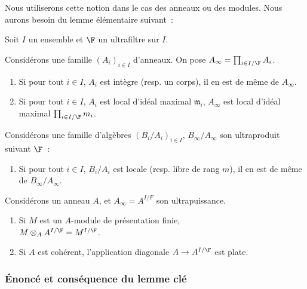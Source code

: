 \documentclass[10pt]{../fichiers-configuration-latex/smfart}
\begin{document}
Nous utiliserons cette notion dans le cas des anneaux ou des modules.
Nous aurons besoin du lemme élémentaire suivant~:
\begin{lemme} \label{21-lm-ultra-prod}
Soit $I$ un ensemble et $\F$ un ultrafiltre sur $I$.

Considérons une famille $(A_i)_{i \in I}$ d'anneaux.
On pose $A_\infty=\prod_{i \in I/\F} A_i$.
\begin{enumerate}
\item[(i)] Si pour tout $i \in I$,
 $A_i$ est intègre (resp. un corps),
  il en est de même de $A_\infty$.
\item[(ii)]  Si pour tout $i \in I$,
 $A_i$ est local d'idéal maximal $\mathfrak{m}_i$,
  $A_\infty$ est local d'idéal maximal $\prod_{i \in I/\F} \mathfrak{m}_i$.
\end{enumerate}

Considérons une famille d'algèbres $(B_i/A_i)_{i \in I}$,
 $B_\infty/A_\infty$ son ultraproduit suivant $\F$~:
\begin{enumerate}
\item[(iii)] Si pour tout $i \in I$,
 $B_i/A_i$ est locale (resp. libre de rang $m$),
  il en est de même de $B_\infty/A_\infty$.
\end{enumerate} 

Considérons un anneau $A$, et $A_\infty=A^{I/F}$ son ultrapuissance.
\begin{enumerate}
\item[(iv)] Si $M$ est un $A$-module de présentation finie, \\
 $M \otimes_A A^{I/\F}=M^{I/\F}$.
\item[(v)] Si $A$ est cohérent, l'application diagonale
 $A \rightarrow A^{I/\F}$ est plate.
\end{enumerate}
\end{lemme}

\subsubsection{Énoncé et conséquence du lemme clé}
\end{document}
